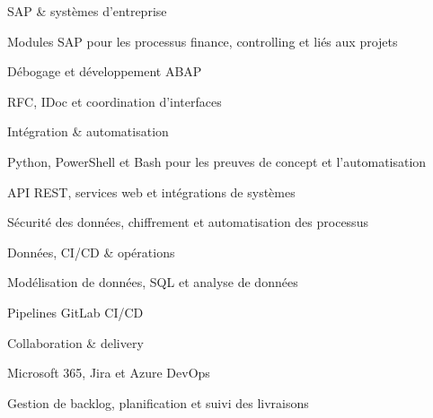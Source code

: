 

\begin{cventries}
  \zcventry
    {SAP \& systèmes d'entreprise} %
    {
      \begin{cvitems} %
        \item {Modules SAP pour les processus finance, controlling et liés aux projets}
        \item {Débogage et développement ABAP}
        \item {RFC, IDoc et coordination d'interfaces}
      \end{cvitems}
    }

  \zcventry
    {Intégration \& automatisation} %
    {
      \begin{cvitems} %
        \item {Python, PowerShell et Bash pour les preuves de concept et l'automatisation}
        \item {API REST, services web et intégrations de systèmes}
        \item {Sécurité des données, chiffrement et automatisation des processus}
      \end{cvitems}
    }

  \zcventry
    {Données, CI/CD \& opérations} %
    {
      \begin{cvitems} %
        \item {Modélisation de données, SQL et analyse de données}
        \item {Pipelines GitLab CI/CD}
      \end{cvitems}
    }

  \zcventry
    {Collaboration \& delivery} %
    {
      \begin{cvitems} %
        \item {Microsoft 365, Jira et Azure DevOps}
        \item {Gestion de backlog, planification et suivi des livraisons}
      \end{cvitems}
    }


\end{cventries}
